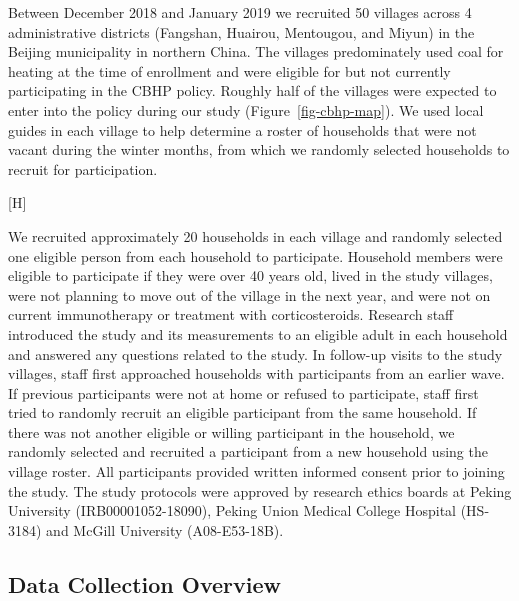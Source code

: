 \documentclass[
  letterpaper,
  DIV=11,
  numbers=noendperiod]{scrartcl}
\makeatletter
\renewenvironment{figure}%
   {\renewcommand\familydefault\sfdefault
    \@float{figure}}
   {\end@float}
\makeatother
\begin{document}
Between December 2018 and January 2019 we recruited 50 villages across 4
administrative districts (Fangshan, Huairou, Mentougou, and Miyun) in
the Beijing municipality in northern China. The villages predominately
used coal for heating at the time of enrollment and were eligible for
but not currently participating in the CBHP policy. Roughly half of the
villages were expected to enter into the policy during our study
(Figure~\ref{fig-cbhp-map}). We used local guides in each village to
help determine a roster of households that were not vacant during the
winter months, from which we randomly selected households to recruit for
participation.

\begin{figure}[H]


\caption{\label{fig-cbhp-map}Map of village implementation of CBHP
policy}

\end{figure}%

We recruited approximately 20 households in each village and randomly
selected one eligible person from each household to participate.
Household members were eligible to participate if they were over 40
years old, lived in the study villages, were not planning to move out of
the village in the next year, and were not on current immunotherapy or
treatment with corticosteroids. Research staff introduced the study and
its measurements to an eligible adult in each household and answered any
questions related to the study. In follow-up visits to the study
villages, staff first approached households with participants from an
earlier wave. If previous participants were not at home or refused to
participate, staff first tried to randomly recruit an eligible
participant from the same household. If there was not another eligible
or willing participant in the household, we randomly selected and
recruited a participant from a new household using the village roster.
All participants provided written informed consent prior to joining the
study. The study protocols were approved by research ethics boards at
Peking University (IRB00001052-18090), Peking Union Medical College
Hospital (HS-3184) and McGill University (A08-E53-18B).

\subsection{Data Collection Overview}\label{data-collection-overview}
\end{document}
